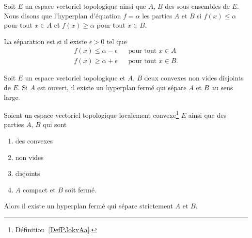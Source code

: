 \begin{definition}
	Soit \( E\) un espace vectoriel topologique ainsi que \( A\), \( B\) des sous-ensembles de \( E\). Nous disons que l'hyperplan d'équation \( f=\alpha\)  les parties \( A\) et \( B\) si \( f(x)\leq \alpha\) pour tout \( x\in A\) et \( f(x)\geq \alpha\) pour tout \( x\in B\).

	La séparation est  si il existe \( \epsilon>0\) tel que
	\begin{subequations}
		\begin{align}
			f(x)\leq \alpha-\epsilon &  & \text{pour tout } x\in A  \\
			f(x)\geq \alpha+\epsilon &  & \text{pour tout } x\in B.
		\end{align}
	\end{subequations}
\end{definition}

\begin{theorem}  \label{ThoSAJjdZc}
	Soit \( E\) un espace vectoriel topologique et \( A\), \( B\) deux convexes non vides disjoints de \( E\). Si \( A\) est ouvert, il existe un hyperplan fermé qui sépare \( A\) et \( B\) au sens large.
\end{theorem}

\begin{theorem} \label{ThoACuKgtW}
	Soient un espace vectoriel topologique localement convexe\footnote{Définition~\ref{DefPJokvAa}.} \( E\) ainsi que des parties \( A\), \( B\) qui sont
	\begin{enumerate}
		\item
		      des convexes
		\item
		      non vides
		\item
		      disjoints
		\item
		      \( A\) compact et \( B\) soit fermé.
	\end{enumerate}
	Alors il existe un hyperplan fermé qui sépare strictement \( A\) et \( B\).
\end{theorem}

